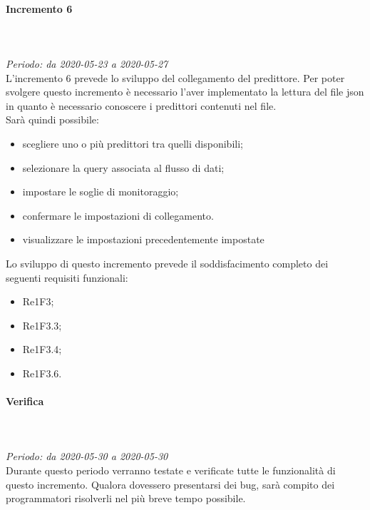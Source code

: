 \paragraph{Incremento 6}\mbox{} \\ \mbox{} \\ 
\textit{Periodo: da 2020-05-23 a 2020-05-27}\\
L’incremento 6 prevede lo sviluppo del collegamento del predittore. Per poter svolgere questo incremento è necessario l'aver implementato la lettura del file json in quanto è necessario conoscere i predittori contenuti nel file. \\
Sarà quindi possibile:
\begin{itemize}
	\item scegliere uno o più predittori tra quelli disponibili;
	\item selezionare la query associata al flusso di dati;
	\item impostare le soglie di monitoraggio;
	\item confermare le impostazioni di collegamento.
	\item visualizzare le impostazioni precedentemente impostate
\end{itemize}
Lo sviluppo di questo incremento prevede il soddisfacimento completo dei seguenti requisiti funzionali:
\begin{itemize}
\item Re1F3;
\item Re1F3.3;
\item Re1F3.4;
\item Re1F3.6.
\end{itemize}
\paragraph*{Verifica}\mbox{} \\ \mbox{} \\ 
\textit{Periodo: da 2020-05-30 a 2020-05-30}\\
Durante questo periodo verranno testate e verificate tutte le funzionalità di questo incremento. Qualora dovessero presentarsi dei bug, sarà compito dei programmatori risolverli nel più breve tempo possibile.

